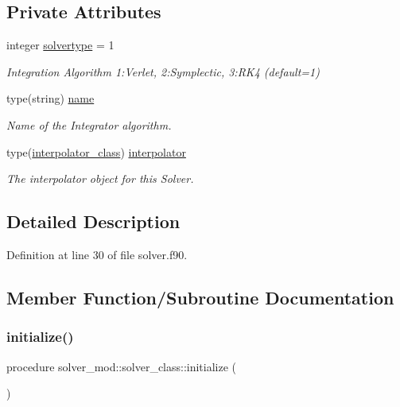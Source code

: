 \subsection*{Private Attributes}
\begin{DoxyCompactItemize}
\item 
integer \mbox{\hyperlink{structsolver__mod_1_1solver__class_a6bd9eec5b3a11d34981b191b54944ac4}{solvertype}} = 1
\begin{DoxyCompactList}\small\item\em Integration Algorithm 1\+:Verlet, 2\+:Symplectic, 3\+:R\+K4 (default=1) \end{DoxyCompactList}\item 
type(string) \mbox{\hyperlink{structsolver__mod_1_1solver__class_a0a2677f8e0403b82095b826378f9439d}{name}}
\begin{DoxyCompactList}\small\item\em Name of the Integrator algorithm. \end{DoxyCompactList}\item 
type(\mbox{\hyperlink{structinterpolator__mod_1_1interpolator__class}{interpolator\+\_\+class}}) \mbox{\hyperlink{structsolver__mod_1_1solver__class_af973ac0cafba3b94744399ae41a984ee}{interpolator}}
\begin{DoxyCompactList}\small\item\em The interpolator object for this Solver. \end{DoxyCompactList}\end{DoxyCompactItemize}


\subsection{Detailed Description}


Definition at line 30 of file solver.\+f90.



\subsection{Member Function/\+Subroutine Documentation}
\mbox{\label{structsolver__mod_1_1solver__class_a9ac72acd3e4fbb8881c7eaabe9e3d585}} 
\subsubsection{\texorpdfstring{initialize()}{initialize()}}
{\footnotesize\ttfamily procedure solver\+\_\+mod\+::solver\+\_\+class\+::initialize (\begin{DoxyParamCaption}{ }\end{DoxyParamCaption})\hspace{0.3cm}{\ttfamily [private]}}




